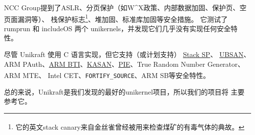 \documentclass[UTF8,fontset=none,linespread=1.15]{ctexart}
\let\nosupcite\cite
\renewcommand*{\cite}[1]{\textsuperscript{\nosupcite{#1}}}
\begin{document}
NCC Group提到了ASLR、分页保护（如W\^{}X政策、内部数据加固、保护页、空页面漏洞等）、
栈保护标志\footnote{它的英文stack canary来自金丝雀曾经被用来检查煤矿的有毒气体的典故\cite{bib:canary}。}、堆加固、标准库加固等安全措施。
它测试了 rumprun 和 includeOS 两个 unikernels，并发现它们几乎没有实现任何安全特性。

尽管 Unikraft 使用 C 语言实现，但它支持（或计划支持）
\href{https://github.com/unikraft/unikraft/tree/staging/lib/uksp}{Stack SP}、
\href{https://github.com/unikraft/unikraft/tree/staging/lib/ubsan}{UBSAN}、ARM PAuth、\href{https://github.com/unikraft/unikraft/pull/421}{ARM BTI}、\href{https://github.com/unikraft/unikraft/pull/191}{KASAN}、\href{https://github.com/unikraft/unikraft/pull/239}{PIE}、True Random Number Generator、ARM MTE、
Intel CET、\texttt{FORTIFY\_SOURCE}、ARM SB等安全特性。\cite{bib:unikraft-secuirty}

总的来说，Unikraft是我们发现的最好的unikernel项目，所以我们的项目将
主要参考它。
\end{document}
